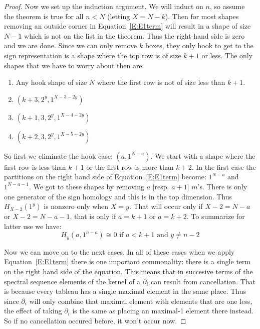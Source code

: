 \documentclass{amsart}
\begin{document}
\begin{proof}
  Now we set up the induction argument. We will induct on $n$, so assume the theorem is true for all $n < N$ 
  (letting $X=N-k$). Then for most
  shapes removing an outside corner in Equation~\ref{E:E1term} will result in a shape of size $N-1$ which is not on the
  list in the theorem. Thus the right-hand side is zero and we are done. Since we can only remove $k$ boxes, they only
  hook to get to the sign representation is a shape where the top row is of size $k+1$ or less. 
  The only shapes that we have to worry about then
  are: 
  \begin{enumerate}
    \item Any hook shape of size $N$ where the first row is not of size less than $k+1$.
    \item $(k+3, 2^y, 1^{X-3-2y})$
    \item $(k+1, 3, 2^y, 1^{X-4-2y})$
    \item $(k+2, 3, 2^y, 1^{X-5-2y})$
  \end{enumerate}

  So first we eliminate the hook case: $(a, 1^{N-a})$. 
  We start with a shape where the first row is less than $k+1$ or
  the first row is more than $k+2$. In the first case the partitions on the right hand side of Equation~\ref{E:E1term} 
   become: $1^{N-a}$ and $1^{N-a-1}$. We got to these shapes
  by removing $a$ [resp. $a+1$] $m$'s. There is only one generator of the sign homology and this is in the top dimension.
  Thus $H_{X-2}(1^y)$ is nonzero only when $X=y$. That will occur only if $X-2 = N-a$ or $X-2 = N-a-1$, that is only if 
  $a= k+1$ or $a=k+2$. To summarize for latter use we have:
  \begin{equation} \label{E:smallhook}
    H_y(a, 1^{n-a}) \cong 0 \mbox{ if $a < k+1$ and $y \ne n-2$}
  \end{equation}

  Now we can move on to the next cases. In all of these cases when we apply Equation~\ref{E:E1term} there is one 
  important commonality: there is a single term on the right hand side of the equation. This means that in succesive terms
  of the spectral sequence elements of the kernel of a $\partial_i$ can result from cancellation. That is because every 
  tableau has a single maximal element in the same place. Thus since $\partial_i$ will only combine that maximal element
  with elements that are one less, the effect of taking $\partial_i$ is the same as placing an maximal-1 element there 
  instead. So if no cancellation occured before, it won't occur now.


\end{proof}
\end{document}
